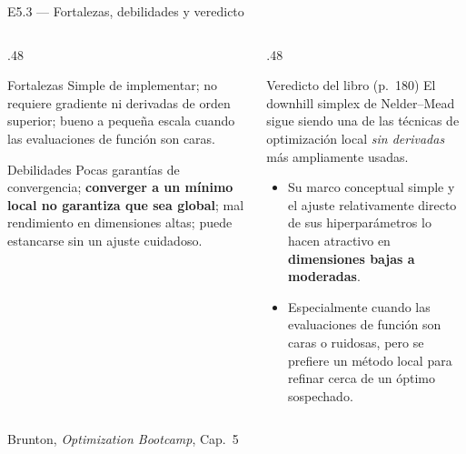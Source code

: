 \documentclass[10pt,aspectratio=169]{beamer}
\newcommand{\fuente}{\vfill{\scriptsize\color{gray}Brunton, \emph{Optimization Bootcamp}, Cap.~5}}
\begin{document}
\begin{frame}{E5.3 --- Fortalezas, debilidades y veredicto}
  \small
  \begin{columns}[T,onlytextwidth]
    \begin{column}{.48\textwidth}
      \begin{block}{Fortalezas}
        \small
        Simple de implementar; no requiere gradiente ni derivadas de orden
        superior; bueno a pequeña escala cuando las evaluaciones de función
        son caras.
      \end{block}
      \begin{block}{Debilidades}
        \small
        Pocas garantías de convergencia; \textbf{converger a un mínimo local no
        garantiza que sea global}; mal rendimiento en dimensiones altas;
        puede estancarse sin un ajuste cuidadoso.
      \end{block}
    \end{column}
    \begin{column}{.48\textwidth}
      \begin{block}{Veredicto del libro (p.~180)}
        \small
        El downhill simplex de Nelder--Mead sigue siendo una de las técnicas
        de optimización local \emph{sin derivadas} más ampliamente usadas.
      \end{block}
      \begin{itemize}
        \item Su marco conceptual simple y el ajuste relativamente directo de
          sus hiperparámetros lo hacen atractivo en \textbf{dimensiones bajas a
          moderadas}.
        \item Especialmente cuando las evaluaciones de función son caras o
          ruidosas, pero se prefiere un método local para refinar cerca de un
          óptimo sospechado.
      \end{itemize}
    \end{column}
  \end{columns}
  \fuente
\end{frame}
\end{document}
